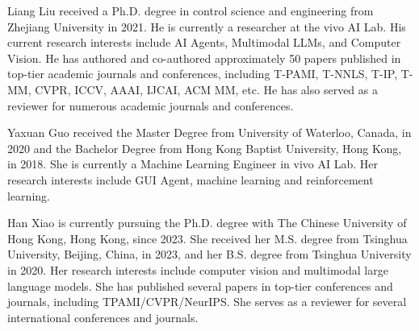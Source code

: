 \begin{IEEEbiography}{Liang Liu}
received a Ph.D. degree in control science and engineering from Zhejiang University in 2021. He is currently a researcher at the vivo AI Lab. His current research interests include AI Agents, Multimodal LLMs, and Computer Vision. He has authored and co-authored approximately 50 papers published in top-tier academic journals and conferences, including T-PAMI, T-NNLS, T-IP, T-MM, CVPR, ICCV, AAAI, IJCAI, ACM MM, etc. He has also served as a reviewer for numerous academic journals and conferences.
\end{IEEEbiography}

\vspace{-3em}

\begin{IEEEbiography}{Yaxuan Guo}
received the Master Degree from University of Waterloo, Canada, in 2020 and the Bachelor Degree from Hong Kong Baptist University, Hong Kong, in 2018. She is currently a Machine Learning Engineer in vivo AI Lab. Her research interests include GUI Agent, machine learning and reinforcement learning.
\end{IEEEbiography}

\vspace{-3em}

\begin{IEEEbiography}{Han Xiao}
is currently pursuing the Ph.D. degree with The Chinese University of Hong Kong, Hong Kong, since 2023. She received her M.S. degree from Tsinghua University, Beijing, China, in 2023, and her B.S. degree from Tsinghua University in 2020. Her research interests include computer vision and multimodal large language models. She has published several papers in top-tier conferences and journals, including TPAMI/CVPR/NeurIPS. She serves as a reviewer for several international conferences and journals.
\end{IEEEbiography}

